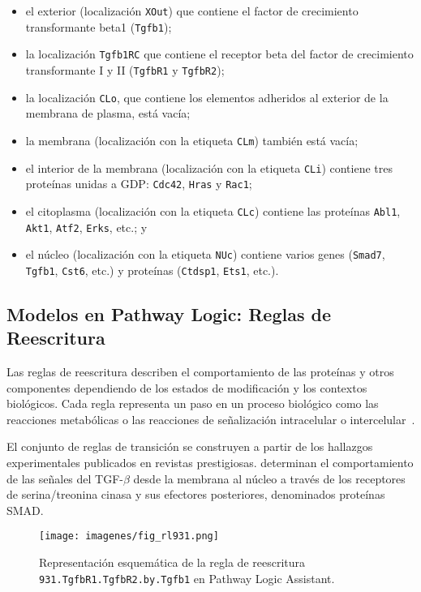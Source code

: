 \begin{itemize}
\item el exterior (localización \texttt{XOut}) que contiene el factor de crecimiento transformante beta1 (\texttt{Tgfb1}); 
\item la localización \texttt{Tgfb1RC} que contiene el receptor beta del factor de crecimiento transformante I y II (\texttt{TgfbR1} y \texttt{TgfbR2}); 
\item la localización \texttt{CLo}, que contiene los elementos adheridos al exterior de la membrana de plasma, está vacía; 
\item la membrana (localización con la etiqueta \texttt{CLm}) también está vacía; 
\item el interior de la membrana (localización con la etiqueta \texttt{CLi}) contiene tres proteínas unidas a GDP: \texttt{Cdc42}, \texttt{Hras} y \texttt{Rac1}; 
\item el citoplasma (localización con la etiqueta \texttt{CLc}) contiene las proteínas \texttt{Abl1}, \texttt{Akt1}, \texttt{Atf2}, \texttt{Erks}, etc.; y 
\item el núcleo (localización con la etiqueta \texttt{NUc}) contiene varios genes (\texttt{Smad7}, \texttt{Tgfb1}, \texttt{Cst6}, etc.) y proteínas (\texttt{Ctdsp1}, \texttt{Ets1}, etc.).
\end{itemize}


\subsection{Modelos en Pathway Logic: Reglas de Reescritura}

Las reglas de reescritura describen el comportamiento de las proteínas y otros componentes dependiendo de los estados de modificación y los contextos biológicos. Cada regla representa un paso en un proceso biológico como las reacciones metabólicas o las reacciones de señalización intracelular o intercelular~\citep{psb/EkerKLLMS02,DBLP:conf/cmsb/EkerLLST03,DBLP:conf/pacbb/Santos-Buitrago17,DBLP:conf/wsc/Talcott06}. 

El conjunto de reglas de transición se construyen a partir de los hallazgos experimentales publicados en revistas prestigiosas. \citet{nakao1997identification} determinan el comportamiento de las señales del TGF-$\beta$ desde la membrana al núcleo a través de los receptores de serina/treonina cinasa y sus efectores posteriores, denominados proteínas SMAD. 
\medskip

\begin{figure}[h!]
\centering
\texttt{[image: imagenes/fig\_rl931.png]}
\caption[Regla de reescritura \texttt{931} en Pathway Logic Assistant]{Representación esquemática de la regla de reescritura \texttt{931.TgfbR1.TgfbR2.by.Tgfb1} en Pathway Logic Assistant.}
\label{fig:rule931}
\end{figure}


